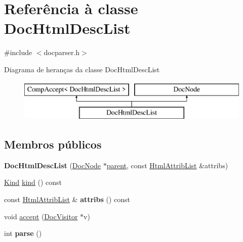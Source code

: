 \hypertarget{class_doc_html_desc_list}{\section{Referência à classe Doc\-Html\-Desc\-List}
\label{class_doc_html_desc_list}
}


{\ttfamily \#include $<$docparser.\-h$>$}

Diagrama de heranças da classe Doc\-Html\-Desc\-List\begin{figure}[H]
\begin{center}
\leavevmode
\includegraphics[height=2.000000cm]{class_doc_html_desc_list}
\end{center}
\end{figure}
\subsection*{Membros públicos}
\begin{DoxyCompactItemize}
\item 
\hypertarget{class_doc_html_desc_list_aba18b62383d6d1f61e7e25875c5b86be}{{\bfseries Doc\-Html\-Desc\-List} (\hyperlink{class_doc_node}{Doc\-Node} $\ast$\hyperlink{class_doc_node_abd7f070d6b0a38b4da71c2806578d19d}{parent}, const \hyperlink{class_html_attrib_list}{Html\-Attrib\-List} \&attribs)}\label{class_doc_html_desc_list_aba18b62383d6d1f61e7e25875c5b86be}

\item 
\hyperlink{class_doc_node_aa10c9e8951b8ccf714a59ec321bdac5b}{Kind} \hyperlink{class_doc_html_desc_list_aa9d037bed9f9a083d0cd01485637d843}{kind} () const 
\item 
\hypertarget{class_doc_html_desc_list_aae3c838ea3d3273b35d07e9965a8985e}{const \hyperlink{class_html_attrib_list}{Html\-Attrib\-List} \& {\bfseries attribs} () const }\label{class_doc_html_desc_list_aae3c838ea3d3273b35d07e9965a8985e}

\item 
void \hyperlink{class_doc_html_desc_list_a7ba716e854ae2f8f87a4eb2140e302b6}{accept} (\hyperlink{class_doc_visitor}{Doc\-Visitor} $\ast$v)
\item 
\hypertarget{class_doc_html_desc_list_a67007fc2be130666fbf3b065022756f4}{int {\bfseries parse} ()}\label{class_doc_html_desc_list_a67007fc2be130666fbf3b065022756f4}

\end{DoxyCompactItemize}

